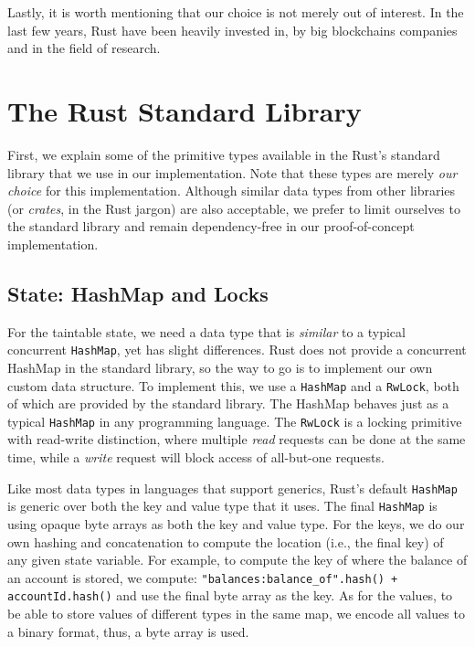 Lastly, it is worth mentioning that our choice is not merely out of interest. In the last few years,
Rust have been heavily invested in, by big blockchains companies and in the field of
research\cite{RustBlockchain}.

\section{The Rust Standard Library}

First, we explain some of the primitive types available in the Rust's standard library that we
use in our implementation. Note that these types are merely \textit{our choice} for this implementation. Although similar data
types from other libraries (or \textit{crates}, in the Rust jargon) are also acceptable, we prefer
to limit ourselves to the standard library and remain dependency-free in our proof-of-concept
implementation.

\subsection{State: HashMap and Locks} \label{chap:impl:subsec:state_and_concurrent_map}

For the taintable state, we need a data type that is \textit{similar} to a typical concurrent
\texttt{HashMap}\cite{barnatFastDynamicallySizedConcurrent2015}, yet has slight differences. Rust
does not provide a concurrent HashMap in the standard library, so the way to go is to
implement our own custom data structure. To implement this, we use a \texttt{HashMap} and a
\texttt{RwLock}, both of which are provided by the standard library. The HashMap behaves just as a
typical \texttt{HashMap} in any programming language. The \texttt{RwLock} is a locking primitive
with read-write distinction, where multiple \textit{read} requests can be done at the same time,
while a \textit{write} request will block access of all-but-one requests.

Like most data types in languages that support generics, Rust's default \texttt{HashMap} is
generic over both the key and value type that it uses. The final \texttt{HashMap} is using opaque
byte arrays as both the key and value type. For the keys, we do our own hashing and concatenation to
compute the location (i.e., the final key) of any given state variable. For example, to compute the
key of where the balance of an account is stored, we compute: \texttt{"balances:balance\_of".hash()
+ accountId.hash()} and use the final byte array as the key. As for the values, to be able to store
values of different types in the same map, we encode all values to a binary format, thus, a byte
array is used.

